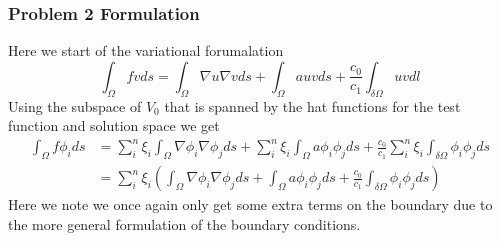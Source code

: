 \documentclass[11pt]{article}
\begin{document}
\subsubsection{Problem 2 Formulation}
Here we start of the variational forumalation
\begin{equation}
	\int_{\Omega} f v ds = \int_{\Omega} \nabla u \nabla v ds + \int_{\Omega} a u v ds + \frac{c_0}{c_1}\int_{\delta \Omega} u v dl 
\end{equation} 
Using the subspace of $V_0$ that is spanned by the hat functions for the test function and solution space we get
\begin{align}
	\int_{\Omega} f \phi_i ds &= \sum^n_i \xi_i \int_{\Omega} \nabla \phi_i \nabla \phi_j ds + \sum^n_i \xi_i \int_{\Omega} a \phi_i \phi_j  ds + \frac{c_0}{c_1} \sum^n_i \xi_i \int_{\delta \Omega} \phi_i \phi_j ds \\
	&= \sum^n_i \xi_i ( \int_{\Omega} \nabla \phi_i \nabla \phi_j ds + \int_{\Omega} a \phi_i \phi_j  ds + \frac{c_0}{c_1} \int_{\delta \Omega} \phi_i \phi_j ds )
\end{align}
Here we note we once again only get some extra terms on the boundary due to the more general formulation of the boundary conditions. 

\newpage
\end{document}
